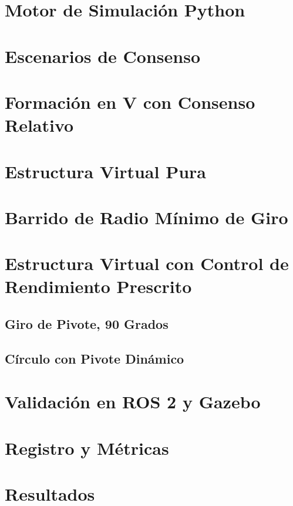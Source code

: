 \section{Motor de Simulación Python}
\section{Escenarios de Consenso}
\section{Formación en V con Consenso Relativo}
\section{Estructura Virtual Pura}
\section{Barrido de Radio Mínimo de Giro}
\section{Estructura Virtual con Control de Rendimiento Prescrito}
\subsection{Giro de Pivote, 90 Grados}
\subsection{Círculo con Pivote Dinámico}
\section{Validación en ROS 2 y Gazebo}
\section{Registro y Métricas}
\section{Resultados}

